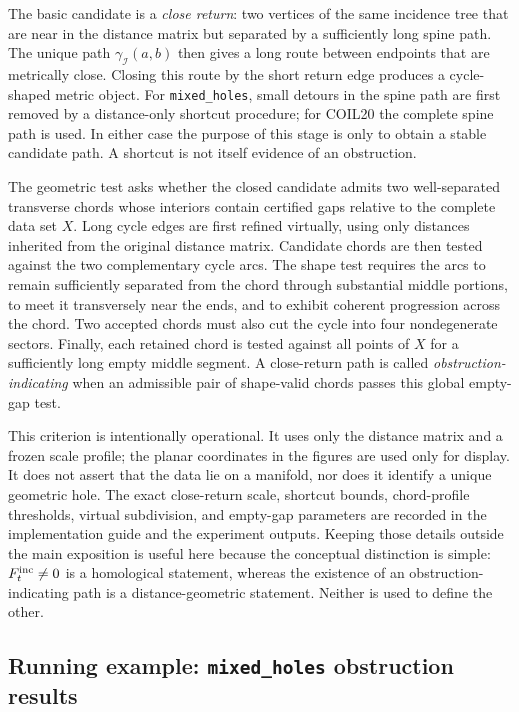 \documentclass[a4paper,11pt]{article}
\theoremstyle{definition}
\theoremstyle{remark}
\begin{document}
The basic candidate is a \emph{close return}: two vertices of the same incidence tree that are near in the distance matrix but separated by a sufficiently long spine path. The unique path $\gamma_{\mathcal I}(a,b)$ then gives a long route between endpoints that are metrically close. Closing this route by the short return edge produces a cycle-shaped metric object. For \texttt{mixed\_holes}, small detours in the spine path are first removed by a distance-only shortcut procedure; for COIL20 the complete spine path is used. In either case the purpose of this stage is only to obtain a stable candidate path. A shortcut is not itself evidence of an obstruction.

The geometric test asks whether the closed candidate admits two well-separated transverse chords whose interiors contain certified gaps relative to the complete data set $X$. Long cycle edges are first refined virtually, using only distances inherited from the original distance matrix. Candidate chords are then tested against the two complementary cycle arcs. The shape test requires the arcs to remain sufficiently separated from the chord through substantial middle portions, to meet it transversely near the ends, and to exhibit coherent progression across the chord. Two accepted chords must also cut the cycle into four nondegenerate sectors. Finally, each retained chord is tested against all points of $X$ for a sufficiently long empty middle segment. A close-return path is called \emph{obstruction-indicating} when an admissible pair of shape-valid chords passes this global empty-gap test.

This criterion is intentionally operational. It uses only the distance matrix and a frozen scale profile; the planar coordinates in the figures are used only for display. It does not assert that the data lie on a manifold, nor does it identify a unique geometric hole. The exact close-return scale, shortcut bounds, chord-profile thresholds, virtual subdivision, and empty-gap parameters are recorded in the implementation guide and the experiment outputs. Keeping those details outside the main exposition is useful here because the conceptual distinction is simple: $F_t^{\rm inc}\neq 0$ is a homological statement, whereas the existence of an obstruction-indicating path is a distance-geometric statement. Neither is used to define the other.

\subsection{Running example: \texttt{mixed\_holes} obstruction results}
\label{subsec:mixed-holes-obstruction}
\end{document}
